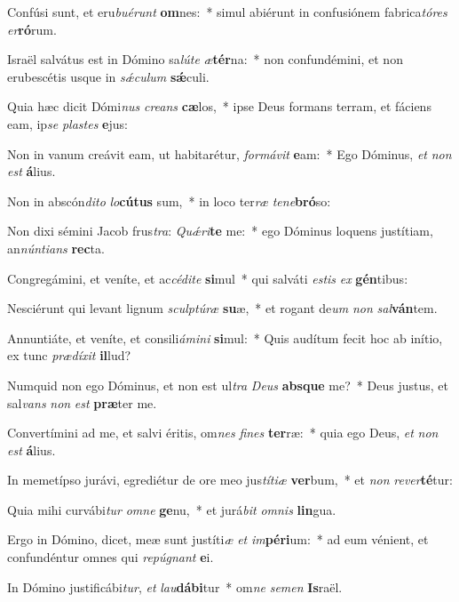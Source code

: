 \item Confúsi sunt, et eru\textit{bu}\textit{é}\textit{runt} \textbf{om}nes:~* simul abiérunt in confusiónem fabrica\textit{tó}\textit{res} \textit{er}\textbf{ró}rum.
\item Israël salvátus est in Dómino sa\textit{lú}\textit{te} \textit{æ}\textbf{tér}na:~* non confundémini, et non erubescétis usque in \textit{sǽ}\textit{cu}\textit{lum} \textbf{sǽ}culi.
\item Quia hæc dicit Dómi\textit{nus} \textit{cre}\textit{ans} \textbf{cæ}los,~* ipse Deus formans terram, et fáciens eam, ip\textit{se} \textit{plas}\textit{tes} \textbf{e}jus:
\item Non in vanum creávit eam, ut habitarétur, \textit{for}\textit{má}\textit{vit} \textbf{e}am:~* Ego Dóminus, \textit{et} \textit{non} \textit{est} \textbf{á}lius.
\item Non in abscón\textit{di}\textit{to} \textit{lo}\textbf{cú}\textbf{tus} sum,~* in loco ter\textit{ræ} \textit{te}\textit{ne}\textbf{bró}so:
\item Non dixi sémini Jacob frus\textit{tra}: \textit{Quǽ}\textit{ri}\textbf{te} me:~* ego Dóminus loquens justítiam, an\textit{nún}\textit{ti}\textit{ans} \textbf{rec}ta.
\item Congregámini, et veníte, et ac\textit{cé}\textit{di}\textit{te} \textbf{si}mul~* qui salváti \textit{es}\textit{tis} \textit{ex} \textbf{gén}tibus:
\item Nesciérunt qui levant lignum \textit{sculp}\textit{tú}\textit{ræ} \textbf{su}æ,~* et rogant de\textit{um} \textit{non} \textit{sal}\textbf{ván}tem.
\item Annuntiáte, et veníte, et consili\textit{á}\textit{mi}\textit{ni} \textbf{si}mul:~* Quis audítum fecit hoc ab inítio, ex tunc \textit{præ}\textit{dí}\textit{xit} \textbf{il}lud?
\item Numquid non ego Dóminus, et non est ul\textit{tra} \textit{De}\textit{us} \textbf{abs}\textbf{que} me?~* Deus justus, et sal\textit{vans} \textit{non} \textit{est} \textbf{præ}ter me.
\item Convertímini ad me, et salvi éritis, om\textit{nes} \textit{fi}\textit{nes} \textbf{ter}ræ:~* quia ego Deus, \textit{et} \textit{non} \textit{est} \textbf{á}lius.
\item In memetípso jurávi, egrediétur de ore meo jus\textit{tí}\textit{ti}\textit{æ} \textbf{ver}bum,~* et \textit{non} \textit{re}\textit{ver}\textbf{té}tur:
\item Quia mihi curvábi\textit{tur} \textit{om}\textit{ne} \textbf{ge}nu,~* et jurá\textit{bit} \textit{om}\textit{nis} \textbf{lin}gua.
\item Ergo in Dómino, dicet, meæ sunt justíti\textit{æ} \textit{et} \textit{im}\textbf{pé}\textbf{ri}um:~* ad eum vénient, et confundéntur omnes qui \textit{re}\textit{pú}\textit{gnant} \textbf{e}i.
\item In Dómino justificábi\textit{tur}, \textit{et} \textit{lau}\textbf{dá}\textbf{bi}tur~* om\textit{ne} \textit{se}\textit{men} \textbf{Is}raël.
